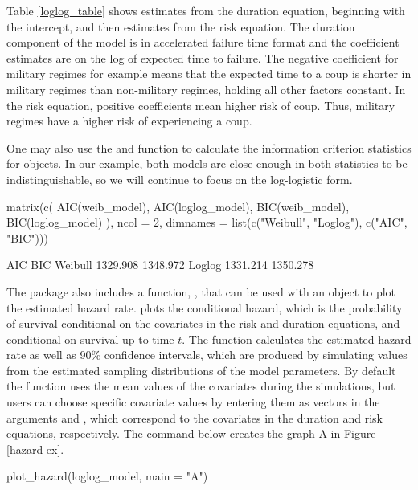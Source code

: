 \documentclass[article]{jss}
\begin{document}
Table \ref{loglog_table} shows estimates from the duration equation,
beginning with the intercept, and then estimates from the risk equation.
The duration component of the model is in accelerated failure time
format and the coefficient estimates are on the log of expected time to
failure. The negative coefficient for military regimes for example means
that the expected time to a coup is shorter in military regimes than
non-military regimes, holding all other factors constant. In the risk
equation, positive coefficients mean higher risk of coup. Thus, military
regimes have a higher risk of experiencing a coup.

One may also use the  and  function to calculate the
information criterion statistics for  objects. In our
example, both models are close enough in both statistics to be
indistinguishable, so we will continue to focus on the log-logistic
form.

\begin{CodeChunk}
\begin{CodeInput}
matrix(c(
  AIC(weib_model), AIC(loglog_model), BIC(weib_model), BIC(loglog_model)
  ), ncol = 2, dimnames = list(c("Weibull", "Loglog"), c("AIC", "BIC")))
\end{CodeInput}
\begin{CodeOutput}
             AIC      BIC
Weibull 1329.908 1348.972
Loglog  1331.214 1350.278
\end{CodeOutput}
\end{CodeChunk}

The package also includes a function, , that can be
used with an  object to plot the estimated hazard rate.
 plots the conditional hazard, which is the
probability of survival conditional on the covariates in the risk and
duration equations, and conditional on survival up to time \(t\). The
function calculates the estimated hazard rate as well as 90\% confidence
intervals, which are produced by simulating values from the estimated
sampling distributions of the model parameters. By default the function
uses the mean values of the covariates during the simulations, but users
can choose specific covariate values by entering them as vectors in the
arguments  and , which correspond to the
covariates in the duration and risk equations, respectively. The command
below creates the graph A in Figure \ref{hazard-ex}.

\begin{CodeChunk}
\begin{CodeInput}
plot_hazard(loglog_model, main = "A")
\end{CodeInput}
\end{CodeChunk}
\end{document}
